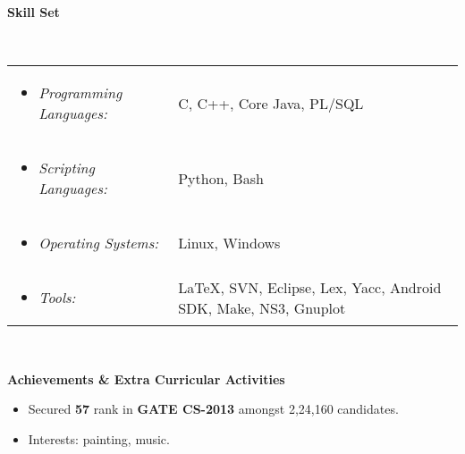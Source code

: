 \documentclass[a4paper,11pt]{article}
\newcommand{\resheading}[1]{{\small \colorbox{mygrey}{\begin{minipage}{0.975\textwidth}{\textbf{#1 \vphantom{p\^{E}}}}\end{minipage}}}}
\begin{document}


\resheading{\textbf{\large Skill Set}}\\

\begin{tabular}{ll}
	
	\begin{minipage}{2in}
		\begin{itemize}
			\item \textit{Programming Languages:}
		\end{itemize}
	\end{minipage}  & C, C++, Core Java, PL/SQL \\
	
	\begin{minipage}{2in}
		
		\begin{itemize}
			\item \textit{Scripting Languages:}
		\end{itemize}
	\end{minipage}  & Python, Bash\\
	
	\begin{minipage}{2in}
		
		\begin{itemize}
			\item \textit{Operating Systems:}
		\end{itemize}
	\end{minipage}  & Linux, Windows \\
	
	
	\begin{minipage}{2in}
		\begin{itemize}
			\item \textit{Tools:}
		\end{itemize}  
	\end{minipage}  & \LaTeX, SVN, Eclipse, Lex, Yacc, Android SDK, Make, NS3, Gnuplot \\
	
\end{tabular}
\\[0.3cm]


\resheading{\textbf{\large Achievements \& Extra Curricular Activities }}

\begin{description}
\item
\begin{itemize}
\item Secured \textbf{57} rank in \textbf{GATE CS-2013} amongst 2,24,160 candidates.
\end{itemize}
\item
\begin{itemize}
\item Interests: painting, music.
\end{itemize}
\end{description}
\end{document}
